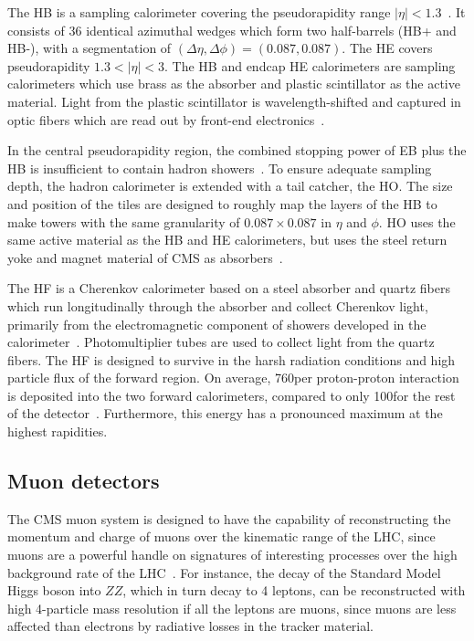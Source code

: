 The HB is a sampling calorimeter covering the pseudorapidity range $|\eta| < 1.3$~\cite{CMS-2008-JINST-3-S08004}. It consists of 36 identical azimuthal wedges which form two half-barrels (HB+ and HB-), with a segmentation of $(\Delta \eta, \Delta \phi) = (0.087, 0.087)$. The HE covers pseudorapidity $1.3 < |\eta| < 3$. The HB and endcap HE calorimeters are sampling calorimeters which use brass as the absorber and plastic scintillator as the active material. Light from the plastic scintillator is wavelength-shifted and captured in optic fibers which are read out by front-end electronics~\cite{CMS-TDR-010-2012}. 

In the central pseudorapidity region, the combined stopping power of EB plus the HB is insufficient to contain hadron showers~\cite{CMS-2008-JINST-3-S08004}. To ensure adequate sampling depth, the hadron calorimeter is extended with a tail catcher, the HO. The size and position of the tiles are designed to roughly map the layers of the HB to make towers with the same granularity of $0.087 \times 0.087$ in $\eta$ and $\phi$. HO uses the same active material as the HB and HE calorimeters, but uses the steel return yoke and magnet material of CMS as absorbers~\cite{CMS-TDR-010-2012}. 


The HF is a Cherenkov calorimeter based on a steel absorber and quartz fibers which run longitudinally through the absorber and collect Cherenkov light, primarily from the electromagnetic component of showers developed in the calorimeter~\cite{CMS-TDR-010-2012}. Photomultiplier tubes are used to  collect light from the quartz fibers. The HF is designed to survive in the harsh radiation conditions and high particle flux of the forward region. On average, 760\GeV per proton-proton interaction is deposited into the two forward calorimeters, compared to only 100\GeV for the rest of the detector~\cite{CMS-2008-JINST-3-S08004}. Furthermore, this energy has a pronounced maximum at the highest rapidities.

\subsection{Muon detectors}
The CMS muon system is designed to have the capability of reconstructing the momentum and charge of muons over the kinematic range of the LHC, since muons are a powerful handle on signatures of interesting processes over the high background rate of the LHC~\cite{CMS-2008-JINST-3-S08004}. For instance, the decay of the Standard Model Higgs boson into $ZZ$, which in turn decay to 4 leptons, can be reconstructed with high 4-particle mass resolution if all the leptons are muons, since muons are less affected than electrons by radiative losses in the tracker material. 

